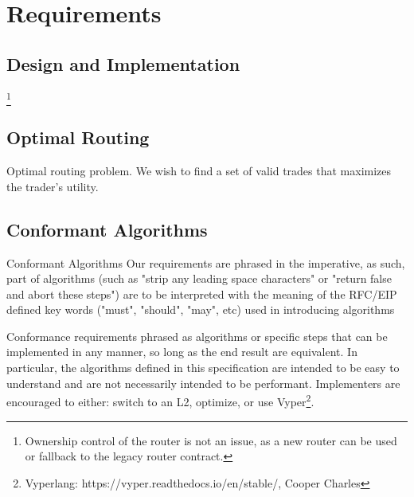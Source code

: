 \documentclass[runningheads]{llncs}
\begin{document}
\newpage
\section{Requirements}

\subsection{Design and Implementation }
\footnote{Ownership control of the router is not an issue, as a new router can be used or fallback to the legacy router contract.}

\subsection{Optimal Routing}
Optimal routing problem. We wish to find a set of valid trades that maximizes the trader's utility.\cite{Angiers 2021, Optimal Routing for Constant Function Market Makers}

\subsection{Conformant Algorithms}

Conformant Algorithms
Our requirements are phrased in the imperative, as such, part of algorithms (such as "strip any leading space characters" or "return false and abort these steps") are to be interpreted with the meaning of the RFC/EIP defined key words ("must", "should", "may", etc) used in introducing algorithms

\hfill \break

Conformance requirements phrased as algorithms or specific steps that can be implemented in any manner, so long as the end result are equivalent. In particular, the algorithms defined in this specification are intended to be easy to understand and are not necessarily intended to be performant. Implementers are encouraged to either: switch to an L2, optimize, or use Vyper\footnote{Vyperlang: https://vyper.readthedocs.io/en/stable/, Cooper Charles}.
\end{document}
